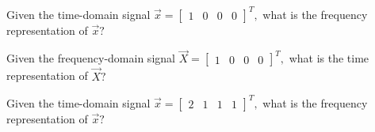 \begin{enumerate}
\qitem Given the time-domain signal $\vec{x} = \begin{bmatrix} 1 & 0 & 0 & 0 \end{bmatrix}^{T},$ what is the frequency representation of $\vec{x}?$


\qitem Given the frequency-domain signal $\vec{X} = \begin{bmatrix} 1 & 0 & 0 & 0 \end{bmatrix}^{T},$ what is the time representation of $\vec{X}?$


\qitem Given the time-domain signal $\vec{x} = \begin{bmatrix} 2 & 1 & 1 & 1 \end{bmatrix}^{T},$ what is the frequency representation of $\vec{x}?$




\end{enumerate}


